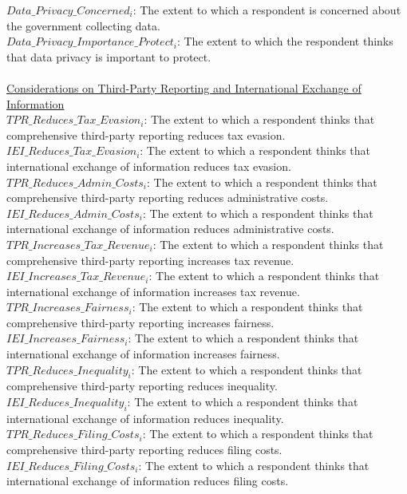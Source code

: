 \documentclass[11pt]{article}
\begin{document}
$Data\_Privacy\_Concerned_i$: The extent to which a respondent is concerned about the government collecting data. \\[0.15em]
$Data\_Privacy\_Importance\_Protect_i$: The extent to which the respondent thinks that data privacy is important to protect.\\[0.15em]
\\
\underline{Considerations on Third-Party Reporting and International Exchange of Information} \\[0.15em]
$TPR\_Reduces\_Tax\_Evasion_i$: The extent to which a respondent thinks that comprehensive third-party reporting reduces tax evasion. \\[0.15em]
$IEI\_Reduces\_Tax\_Evasion_i$: The extent to which a respondent thinks that international exchange of information reduces tax evasion.\\[0.15em]
$TPR\_Reduces\_Admin\_Costs_i$: The extent to which a respondent thinks that comprehensive third-party reporting reduces administrative costs.\\[0.15em]
$IEI\_Reduces\_Admin\_Costs_i$: The extent to which a respondent thinks that international exchange of information reduces administrative costs.\\[0.15em]
$TPR\_Increases\_Tax\_Revenue_i$: The extent to which a respondent thinks that comprehensive third-party reporting increases tax revenue.\\[0.15em]
$IEI\_Increases\_Tax\_Revenue_i$: The extent to which a respondent thinks that international exchange of information increases tax revenue.\\[0.15em]
$TPR\_Increases\_Fairness_i$: The extent to which a respondent thinks that comprehensive third-party reporting increases fairness.\\[0.15em]
$IEI\_Increases\_Fairness_i$: The extent to which a respondent thinks that international exchange of information increases fairness.\\[0.15em]
$TPR\_Reduces\_Inequality_i$: The extent to which a respondent thinks that comprehensive third-party reporting reduces inequality.\\[0.15em]
$IEI\_Reduces\_Inequality_i$: The extent to which a respondent thinks that international exchange of information reduces inequality.\\[0.15em]
$TPR\_Reduces\_Filing\_Costs_i$: The extent to which a respondent thinks that comprehensive third-party reporting reduces filing costs.\\[0.15em]
$IEI\_Reduces\_Filing\_Costs_i$: The extent to which a respondent thinks that international exchange of information reduces filing costs.\\[0.15em]
\end{document}
